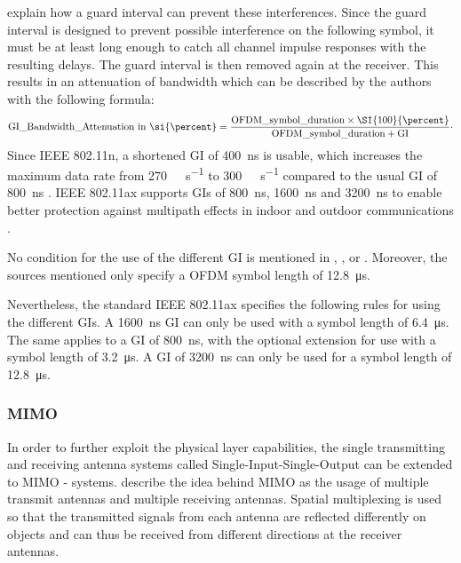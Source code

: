 \textcite{pulimamidi_development_2007} explain how a guard interval can prevent these interferences.
Since the guard interval is designed to prevent possible interference on the following symbol, it must be at least long enough to catch all channel impulse responses with the resulting delays.
The guard interval is then removed again at the receiver.
This results in an attenuation of bandwidth which can be described
by the authors with the following formula:
\begin{equation}\label{eq:GI}
   \text{GI\_Bandwidth\_Attenuation in \si{\percent}} =
   \frac{
      \text{OFDM\_symbol\_duration} \times \SI{100}{\percent}
   }{
      \text{OFDM\_symbol\_duration} + \text{GI}
   }
   \cdot
\end{equation}
Since IEEE 802.11n, a shortened \ac{GI} of \SI{400}{\nano\second} is usable, which increases the
maximum data rate from \SI{270}{\mega\bit\per\second} to \SI{300}{\mega\bit\per\second} compared to
the usual \ac{GI} of \SI{800}{\nano\second} \cite[294,296]{sauter_wireless_2022}.
IEEE 802.11ax supports \ac{GI}s of \SI{800}{\nano\second}, \SI{1600}{\nano\second} and \SI{3200}{\nano\second} to
enable better protection against multipath effects in indoor and outdoor communications \cite{deng_ieee_2017}.

No condition for the use of the different \ac{GI} is mentioned in \cite{deng_ieee_2017}, \cite{rochim_performance_2020} , \cite{mozaffariahrar_survey_2022} or \cite{afaqui_ieee_2017}.
Moreover, the sources mentioned only specify a \ac{OFDM} symbol length of \SI{12.8}{\micro\second}.

Nevertheless, the standard IEEE 802.11ax \cite{ieee_standard_2021ax} specifies the following rules for using the different \ac{GI}s.
A \SI{1600}{\nano\second} \ac{GI} can only be used with a symbol length of \SI{6.4}{\micro\second}.
The same applies to a \ac{GI} of \SI{800}{\nano\second}, with the optional extension for use with a symbol length of \SI{3.2}{\micro\second}.
A \ac{GI} of \SI{3200}{\nano\second} can only be used for a symbol length of \SI{12.8}{\micro\second}.

\subsubsection*{\acf{MIMO}}
In order to further exploit the physical layer capabilities, the single transmitting and receiving antenna systems called Single-Input-Single-Output can be extended to \ac{MIMO} - systems.
\textcite[294-296]{sauter_wireless_2022} describe the idea behind \ac{MIMO} as the usage of multiple transmit antennas and multiple receiving antennas. Spatial multiplexing is used so that the transmitted signals
from each antenna are reflected differently on objects and can thus be received from different directions at the receiver antennas.

